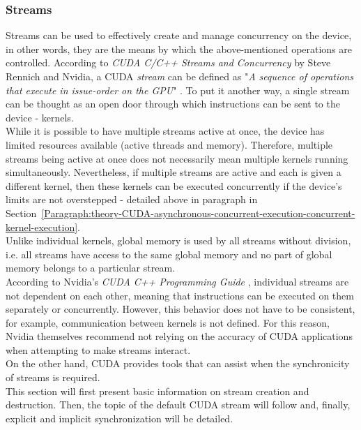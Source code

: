 \subsubsection{Streams}\label{Subsubsection:theory-CUDA-asynchronous-concurrent-execution-concurrent-streams}
Streams can be used to effectively create and manage concurrency on the device, in other words, they are the means by which the above-mentioned operations are controlled. According to \emph{CUDA C/C++ Streams and Concurrency} by Steve Rennich and Nvidia, a CUDA \textit{stream} can be defined as "\textit{A sequence of operations that execute in issue-order on the GPU}" \cite{sk7jHd5INXJOAEUe}. To put it another way, a single stream can be thought as an open door through which instructions can be sent to the device - kernels. \\
While it is possible to have multiple streams active at once, the device has limited resources available (active threads and memory). Therefore, multiple streams being active at once does not necessarily mean multiple kernels running simultaneously. Nevertheless, if multiple streams are active and each is given a different kernel, then these kernels can be executed concurrently if the device's limits are not overstepped - detailed above in paragraph \textit{} in Section~\ref{Paragraph:theory-CUDA-asynchronous-concurrent-execution-concurrent-kernel-execution}. \\
Unlike individual kernels, global memory is used by all streams without division, i.e. all streams have access to the same global memory and no part of global memory belongs to a particular stream. \\
According to Nvidia's \emph{CUDA C++ Programming Guide} \cite{NVIDIAMay2022}, individual streams are not dependent on each other, meaning that instructions can be executed on them separately or concurrently. However, this behavior does not have to be consistent, for example, communication between kernels is not defined. For this reason, Nvidia themselves recommend not relying on the accuracy of CUDA applications when attempting to make streams interact. \\
On the other hand, CUDA provides tools that can assist when the synchronicity of streams is required. \\
This section will first present basic information on stream creation and destruction. Then, the topic of the default CUDA stream will follow and, finally, explicit and implicit synchronization will be detailed.

